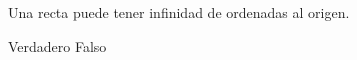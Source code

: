 Una recta puede tener infinidad de ordenadas al origen.

\begin{choices}
    \choice Verdadero
    \CorrectChoice Falso
\end{choices}